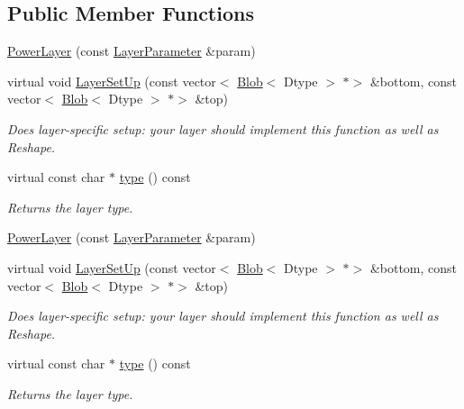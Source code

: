 \subsection*{Public Member Functions}
\begin{DoxyCompactItemize}
\item 
\mbox{\hyperlink{classcaffe_1_1_power_layer_ab008c03c36436e1a0dac0fe1faa53c6d}{Power\+Layer}} (const \mbox{\hyperlink{classcaffe_1_1_layer_parameter}{Layer\+Parameter}} \&param)
\item 
virtual void \mbox{\hyperlink{classcaffe_1_1_power_layer_a954ad3da9a5fd54665de1181b6165796}{Layer\+Set\+Up}} (const vector$<$ \mbox{\hyperlink{classcaffe_1_1_blob}{Blob}}$<$ Dtype $>$ $\ast$$>$ \&bottom, const vector$<$ \mbox{\hyperlink{classcaffe_1_1_blob}{Blob}}$<$ Dtype $>$ $\ast$$>$ \&top)
\begin{DoxyCompactList}\small\item\em Does layer-\/specific setup\+: your layer should implement this function as well as Reshape. \end{DoxyCompactList}\item 
\mbox{\label{classcaffe_1_1_power_layer_ac6d6a562dc64397092a1216bc20d92d5}} 
virtual const char $\ast$ \mbox{\hyperlink{classcaffe_1_1_power_layer_ac6d6a562dc64397092a1216bc20d92d5}{type}} () const
\begin{DoxyCompactList}\small\item\em Returns the layer type. \end{DoxyCompactList}\item 
\mbox{\hyperlink{classcaffe_1_1_power_layer_ab008c03c36436e1a0dac0fe1faa53c6d}{Power\+Layer}} (const \mbox{\hyperlink{classcaffe_1_1_layer_parameter}{Layer\+Parameter}} \&param)
\item 
virtual void \mbox{\hyperlink{classcaffe_1_1_power_layer_a0adeb5a6bdf1e5e437eaae801236fecc}{Layer\+Set\+Up}} (const vector$<$ \mbox{\hyperlink{classcaffe_1_1_blob}{Blob}}$<$ Dtype $>$ $\ast$$>$ \&bottom, const vector$<$ \mbox{\hyperlink{classcaffe_1_1_blob}{Blob}}$<$ Dtype $>$ $\ast$$>$ \&top)
\begin{DoxyCompactList}\small\item\em Does layer-\/specific setup\+: your layer should implement this function as well as Reshape. \end{DoxyCompactList}\item 
\mbox{\label{classcaffe_1_1_power_layer_ac6d6a562dc64397092a1216bc20d92d5}} 
virtual const char $\ast$ \mbox{\hyperlink{classcaffe_1_1_power_layer_ac6d6a562dc64397092a1216bc20d92d5}{type}} () const
\begin{DoxyCompactList}\small\item\em Returns the layer type. \end{DoxyCompactList}\end{DoxyCompactItemize}
